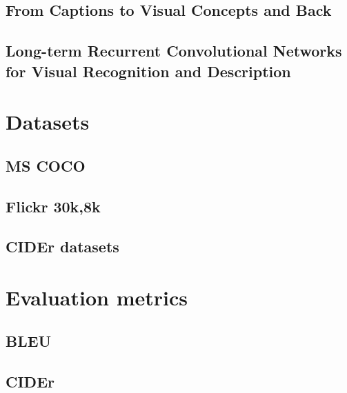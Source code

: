 		
		\subsection{From Captions to Visual Concepts and Back}
		\cite{DBLP:journals/corr/FangGISDDGHMPZZ14}
		
		
		\subsection{Long-term Recurrent Convolutional Networks for Visual Recognition and Description}
		\cite{DBLP:journals/corr/DonahueHGRVSD14}


	\section{Datasets}
	
		\subsection{MS COCO}
		\cite{dataset-coco}
		
		\subsection{Flickr 30k,8k}
		\cite{dataset-flickr30k}
		\cite{dataset-flickr8k}
		
		\subsection{CIDEr datasets}
		\cite{Vedantam_2015_CVPR}		

	\section{Evaluation metrics}
		\subsection{BLEU}
		\cite{Papineni:2002:BMA:1073083.1073135}
		
		\subsection{CIDEr}
		\cite{Vedantam_2015_CVPR}
		
